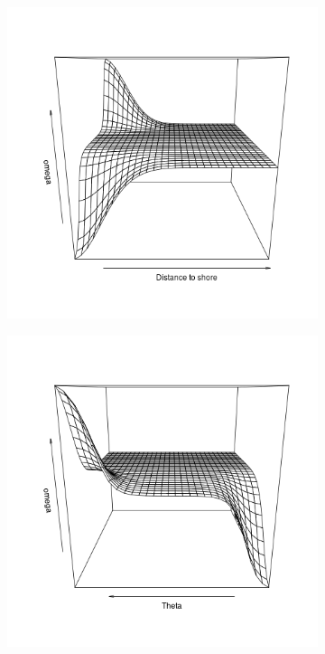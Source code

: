 \documentclass[11pt]{article}
\newcommand {\1}{\mathbb{1}}
\theoremstyle{definition}
\theoremstyle{remark}
\theoremstyle{remark}
\begin{document}
\begin{figure}[H]
	\centering
	\begin{subfigure}{0.48\textwidth}
		\centering
		\includegraphics[scale=0.3]{images/crcvm/smooth_omega1.png}
		\caption{}
		\label{fig: smoothomega1}
	\end{subfigure}
	\begin{subfigure}{0.48\textwidth}
		\centering
		\includegraphics[scale=0.3]{images/crcvm/smooth_omega2.png}
		\caption{}
	\label{fig: smoothomega2}
	\end{subfigure}


\end{figure}
\end{document}
